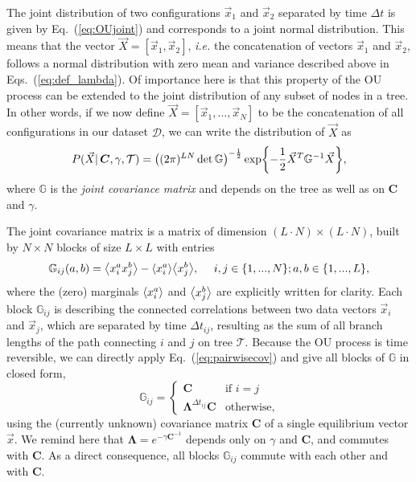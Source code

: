\documentclass[preprint,amsmath,amssymb,superscriptaddress,showpacs,pre]{revtex4-1}
\let\originalleft\left
\let\originalright\right
\renewcommand{\left}{\mathopen{}\mathclose\bgroup\originalleft}
\renewcommand{\right}{\aftergroup\egroup\originalright}
\def\vx{\vec x}
\newcommand{\Lam}{\bm{\Lambda}}
\newcommand{\curlynormal}[1]{\exp\left\{-\frac{1}{2} #1 \right\}}
\newcommand{\iC}{\bm{C}^{-1}}
\newcommand{\av}[1]{\left\langle #1 \right\rangle}
\begin{document}
The joint distribution of two configurations $\vx_1$ and $\vx_2$ separated by time $\Delta t$ is given by Eq.~(\ref{eq:OUjoint}) and corresponds to a joint normal distribution. 
This means that the vector $\vec{X}=[\vx_1, \vx_2]$, \emph{i.e.} the concatenation of vectors $\vx_1$ and $\vx_2$, follows a normal distribution with zero mean and variance described above in Eqs.~(\ref{eq:def_lambda}).
Of importance here is that this property of the OU process can be extended to the joint distribution of any subset of nodes in a tree. 
In other words, if we now define $\vec{X}=[\vx_1,\ldots,\vx_N]$ to be the concatenation of all configurations in our dataset $\mathcal D$, we can write the distribution of $\vec{X}$ as
\begin{equation}
	P(\vec{X}\vert\,\bm{C},\gamma,\mathcal{T}) = \left((2\pi)^{LN}\det\mathbb{G}\right)^{-\frac{1}{2}}\curlynormal{\vec{X}^T\mathbb{G}^{-1}\vec{X}},
	\label{eq:multiOU_jointall}
\end{equation}
where $\mathbb{G}$ is the \emph{joint covariance matrix} and depends on the tree as well as on $\bm{C}$ and $\gamma$.

The joint covariance matrix is a matrix of dimension $(L\cdot N)\times(L\cdot N)$, built by $N\times N$ blocks of size $L\times L$ with entries
\begin{equation}
	\mathbb{G}_{ij}(a,b) = \av{x_i^a x_j^b} - \av{x_i^a}\av{x_j^b},\ \ \ \ i,j\in\{1,...,N\}; a,b\in\{1,...,L\},
	\label{eq:jointcov_1}
\end{equation}
where the (zero) marginals $\av{x_i^a}$ and $\av{x_j^b}$ are explicitly written for clarity.
Each block $\mathbb{G}_{ij}$ is describing the connected correlations between two data vectors $\vx_i$ and $\vx_j$, which are separated by time $\Delta t_{ij}$, resulting as the sum of all branch lengths of the path connecting $i$ and $j$ on tree $\mathcal{T}$. Because the OU process is time reversible, we can directly apply Eq.~(\ref{eq:pairwisecov}) and give all blocks of $\mathbb{G}$ in closed form, 
\begin{equation}
	\mathbb{G}_{ij} =
	\begin{cases}
		\bm C & \text{if $i=j$}\\
		\Lam^{\Delta t_{ij}}{\bm C} & \text{otherwise}  ,
	\end{cases}
	\label{eq:jointcov_2}
\end{equation}
using the (currently unknown) covariance matrix $\bm C$ of a single equilibrium vector $\vx$. We remind here that $\Lam = e^{-\gamma\iC}$ depends only on $\gamma$ and $\bm C$, and commutes with $\bm C$. As a direct consequence, all blocks $\mathbb{G}_{ij}$ commute with each other and with $\bm C$.
\end{document}
